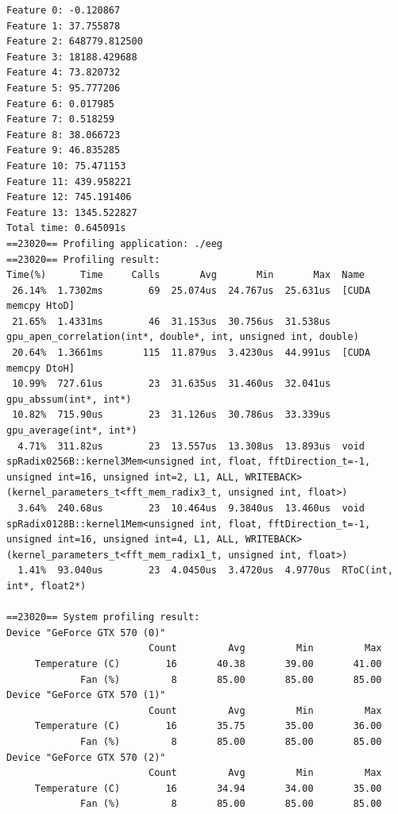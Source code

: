 \documentclass[a4paper]{article}
\begin{document}
\begin{lstlisting}
Feature 0: -0.120867
Feature 1: 37.755878
Feature 2: 648779.812500
Feature 3: 18188.429688
Feature 4: 73.820732
Feature 5: 95.777206
Feature 6: 0.017985
Feature 7: 0.518259
Feature 8: 38.066723
Feature 9: 46.835285
Feature 10: 75.471153
Feature 11: 439.958221
Feature 12: 745.191406
Feature 13: 1345.522827
Total time: 0.645091s
==23020== Profiling application: ./eeg
==23020== Profiling result:
Time(%)      Time     Calls       Avg       Min       Max  Name
 26.14%  1.7302ms        69  25.074us  24.767us  25.631us  [CUDA memcpy HtoD]
 21.65%  1.4331ms        46  31.153us  30.756us  31.538us  gpu_apen_correlation(int*, double*, int, unsigned int, double)
 20.64%  1.3661ms       115  11.879us  3.4230us  44.991us  [CUDA memcpy DtoH]
 10.99%  727.61us        23  31.635us  31.460us  32.041us  gpu_abssum(int*, int*)
 10.82%  715.90us        23  31.126us  30.786us  33.339us  gpu_average(int*, int*)
  4.71%  311.82us        23  13.557us  13.308us  13.893us  void spRadix0256B::kernel3Mem<unsigned int, float, fftDirection_t=-1, unsigned int=16, unsigned int=2, L1, ALL, WRITEBACK>(kernel_parameters_t<fft_mem_radix3_t, unsigned int, float>)
  3.64%  240.68us        23  10.464us  9.3840us  13.460us  void spRadix0128B::kernel1Mem<unsigned int, float, fftDirection_t=-1, unsigned int=16, unsigned int=4, L1, ALL, WRITEBACK>(kernel_parameters_t<fft_mem_radix1_t, unsigned int, float>)
  1.41%  93.040us        23  4.0450us  3.4720us  4.9770us  RToC(int, int*, float2*)

==23020== System profiling result:
Device "GeForce GTX 570 (0)"
                         Count         Avg         Min         Max
     Temperature (C)        16       40.38       39.00       41.00
             Fan (%)         8       85.00       85.00       85.00
Device "GeForce GTX 570 (1)"
                         Count         Avg         Min         Max
     Temperature (C)        16       35.75       35.00       36.00
             Fan (%)         8       85.00       85.00       85.00
Device "GeForce GTX 570 (2)"
                         Count         Avg         Min         Max
     Temperature (C)        16       34.94       34.00       35.00
             Fan (%)         8       85.00       85.00       85.00


\end{lstlisting}
\end{document}

